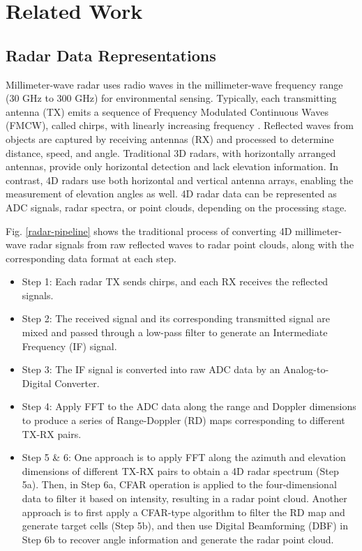 \section{Related Work}
\subsection{Radar Data Representations}
Millimeter-wave radar uses radio waves in the millimeter-wave frequency range (30 GHz to 300 GHz) for environmental sensing. 
Typically, each transmitting antenna (TX) emits a sequence of Frequency Modulated Continuous Waves (FMCW), called chirps, 
with linearly increasing frequency \cite{texas}. 
Reflected waves from objects are captured by receiving antennas (RX) and processed to determine distance, speed, and angle. 
Traditional 3D radars, with horizontally arranged antennas, 
provide only horizontal detection and lack elevation information. 
In contrast, 4D radars use both horizontal and vertical antenna arrays, 
enabling the measurement of elevation angles as well. 
4D radar data can be represented as ADC signals, radar spectra, or point clouds, 
depending on the processing stage. 


Fig. \ref{radar-pipeline} shows the traditional process of converting 4D millimeter-wave radar signals 
from raw reflected waves to radar point clouds, 
along with the corresponding data format at each step.
\begin{itemize}
	\item Step 1: Each radar TX sends chirps, and each RX receives the reflected signals.
	\item Step 2: The received signal and its corresponding transmitted signal are mixed 
							and passed through a low-pass filter to generate an Intermediate Frequency (IF) signal.
	\item Step 3: The IF signal is converted into raw ADC data by an Analog-to-Digital Converter.
	\item Step 4: Apply FFT to the ADC data along the range and Doppler dimensions to produce a series of Range-Doppler (RD) maps 
						corresponding to different TX-RX pairs.
	\item Step 5 \& 6: One approach is to apply FFT along the azimuth and elevation dimensions of different TX-RX pairs
									to obtain a 4D radar spectrum (Step 5a). 
									Then, in Step 6a, CFAR operation is applied to the four-dimensional data to filter it based on intensity, 
									resulting in a radar point cloud. 
									Another approach is to first apply a CFAR-type algorithm to filter the RD map and generate target cells (Step 5b), 
									and then use Digital Beamforming (DBF) in Step 6b to recover angle information and generate the radar point cloud.
\end{itemize}



